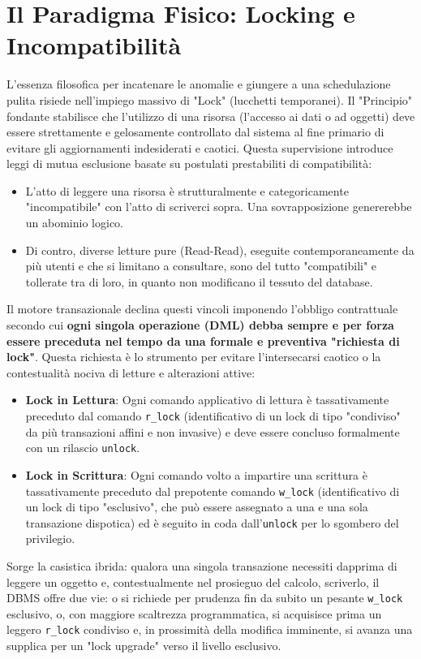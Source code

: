 \section{Il Paradigma Fisico: Locking e Incompatibilità}

L'essenza filosofica per incatenare le anomalie e giungere a una schedulazione pulita risiede nell'impiego massivo di "Lock" (lucchetti temporanei).
Il "Principio" fondante stabilisce che l'utilizzo di una risorsa (l'accesso ai dati o ad oggetti) deve essere strettamente e gelosamente controllato dal sistema al fine primario di evitare gli aggiornamenti indesiderati e caotici.
Questa supervisione introduce leggi di mutua esclusione basate su postulati prestabiliti di compatibilità:
\begin{itemize}
    \item L'atto di leggere una risorsa è strutturalmente e categoricamente "incompatibile" con l'atto di scriverci sopra. Una sovrapposizione genererebbe un abominio logico.
    \item Di contro, diverse letture pure (Read-Read), eseguite contemporaneamente da più utenti e che si limitano a consultare, sono del tutto "compatibili" e tollerate tra di loro, in quanto non modificano il tessuto del database.
\end{itemize}

Il motore transazionale declina questi vincoli imponendo l'obbligo contrattuale secondo cui \textbf{ogni singola operazione (DML) debba sempre e per forza essere preceduta nel tempo da una formale e preventiva "richiesta di lock"}. Questa richiesta è lo strumento per evitare l'intersecarsi caotico o la contestualità nociva di letture e alterazioni attive:
\begin{itemize}
    \item \textbf{Lock in Lettura}: Ogni comando applicativo di lettura è tassativamente preceduto dal comando \texttt{r\_lock} (identificativo di un lock di tipo "condiviso" da più transazioni affini e non invasive) e deve essere concluso formalmente con un rilascio \texttt{unlock}.
    \item \textbf{Lock in Scrittura}: Ogni comando volto a impartire una scrittura è tassativamente preceduto dal prepotente comando \texttt{w\_lock} (identificativo di un lock di tipo "esclusivo", che può essere assegnato a una e una sola transazione dispotica) ed è seguito in coda dall'\texttt{unlock} per lo sgombero del privilegio.
\end{itemize}
Sorge la casistica ibrida: qualora una singola transazione necessiti dapprima di leggere un oggetto e, contestualmente nel prosieguo del calcolo, scriverlo, il DBMS offre due vie: o si richiede per prudenza fin da subito un pesante \texttt{w\_lock} esclusivo, o, con maggiore scaltrezza programmatica, si acquisisce prima un leggero \texttt{r\_lock} condiviso e, in prossimità della modifica imminente, si avanza una supplica per un "lock upgrade" verso il livello esclusivo.

